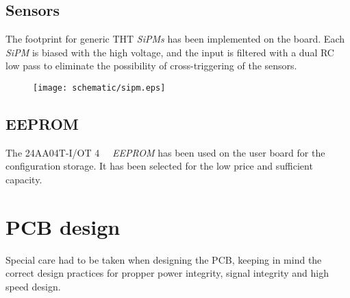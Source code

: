 \section{Sensors}
The footprint for generic THT \emph{SiPMs} has been implemented on the board. Each \emph{SiPM} is biased with the high voltage, and the input is filtered with a dual RC low pass to eliminate the possibility of cross-triggering of the sensors. 

\FloatBarrier
\begin{figure}[htp!]
    \centering
    \texttt{[image: schematic/sipm.eps]}
    \label{fig:sipm}
\end{figure}
\FloatBarrier

\section{EEPROM}
The 24AA04T-I/OT \SI{4}{\kilo\bit} \emph{EEPROM} has been used on the user board for the configuration storage. It has been selected for the low price and sufficient capacity. 

\newpage
\chapter{PCB design}
Special care had to be taken when designing the PCB, keeping in mind the correct design practices for propper power integrity, signal integrity and high speed design. 

